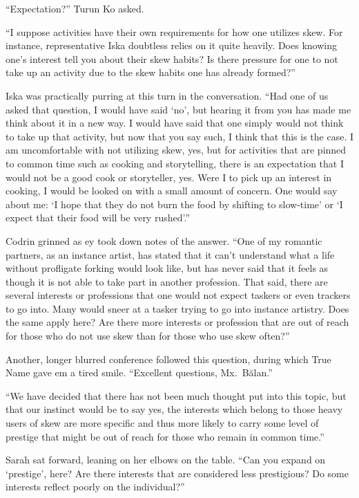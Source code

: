 ``Expectation?'' Turun Ko asked.

``I suppose activities have their own requirements for how one utilizes skew. For instance, representative Iska doubtless relies on it quite heavily. Does knowing one's interest tell you about their skew habits? Is there pressure for one to not take up an activity due to the skew habits one has already formed?''

Iska was practically purring at this turn in the conversation. ``Had one of us asked that question, I would have said `no', but hearing it from you has made me think about it in a new way. I would have said that one simply would not think to take up that activity, but now that you say such, I think that this is the case. I am uncomfortable with not utilizing skew, yes, but for activities that are pinned to common time such as cooking and storytelling, there is an expectation that I would not be a good cook or storyteller, yes. Were I to pick up an interest in cooking, I would be looked on with a small amount of concern. One would say about me: `I hope that they do not burn the food by shifting to slow-time' or `I expect that their food will be very rushed'.''

Codrin grinned as ey took down notes of the answer. ``One of my romantic partners, as an instance artist, has stated that it can't understand what a life without profligate forking would look like, but has never said that it feels as though it is not able to take part in another profession. That said, there are several interests or professions that one would not expect taskers or even trackers to go into. Many would sneer at a tasker trying to go into instance artistry. Does the same apply here? Are there more interests or profession that are out of reach for those who do not use skew than for those who use skew often?''

Another, longer blurred conference followed this question, during which True Name gave em a tired smile. ``Excellent questions, Mx.~Bălan.''

``We have decided that there has not been much thought put into this topic, but that our instinct would be to say yes, the interests which belong to those heavy users of skew are more specific and thus more likely to carry some level of prestige that might be out of reach for those who remain in common time.''

Sarah sat forward, leaning on her elbows on the table. ``Can you expand on `prestige', here? Are there interests that are considered less prestigious? Do some interests reflect poorly on the individual?''

